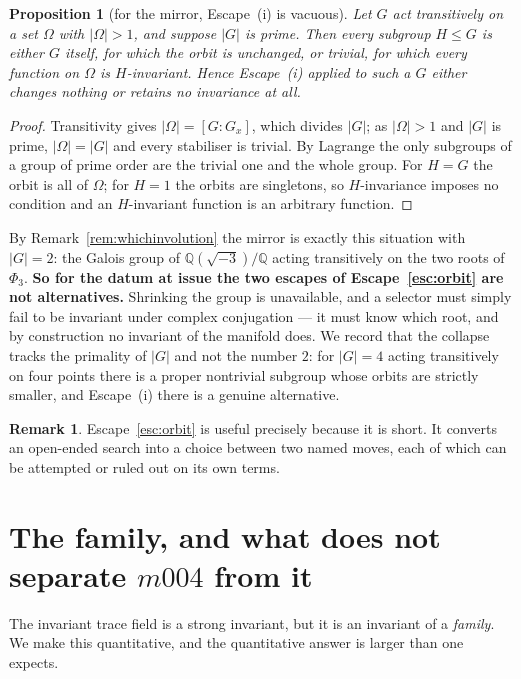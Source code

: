 \documentclass[11pt,a4paper]{article}
\newtheorem{proposition}[theorem]{Proposition}
\theoremstyle{definition}
\newtheorem{remark}[theorem]{Remark}
\theoremstyle{remark}
\newcommand{\Q}{\mathbb{Q}}
\begin{document}
\begin{proposition}[for the mirror, Escape~(i) is vacuous]\label{prop:onlyescape}
Let $G$ act transitively on a set $\Omega$ with $|\Omega|>1$, and suppose $|G|$ is prime. Then
every subgroup $H\le G$ is either $G$ itself, for which the orbit is unchanged, or trivial, for
which \emph{every} function on $\Omega$ is $H$-invariant. Hence Escape~\textup{(i)} applied to such
a $G$ either changes nothing or retains no invariance at all.
\end{proposition}

\begin{proof}
Transitivity gives $|\Omega|=[G:G_x]$, which divides $|G|$; as $|\Omega|>1$ and $|G|$ is prime,
$|\Omega|=|G|$ and every stabiliser is trivial. By Lagrange the only subgroups of a group of prime
order are the trivial one and the whole group. For $H=G$ the orbit is all of $\Omega$; for $H=1$
the orbits are singletons, so $H$-invariance imposes no condition and an $H$-invariant function is
an arbitrary function.
\end{proof}

By Remark~\ref{rem:whichinvolution} the mirror is exactly this situation with $|G|=2$: the Galois
group of $\Q(\sqrt{-3})/\Q$ acting transitively on the two roots of $\Phi_3$. \textbf{So for the
datum at issue the two escapes of Escape~\ref{esc:orbit} are not alternatives.} Shrinking the group
is unavailable, and a selector must simply fail to be invariant under complex conjugation --- it
must know which root, and by construction no invariant of the manifold does. We record that the
collapse tracks the primality of $|G|$ and not the number $2$: for $|G|=4$ acting transitively on
four points there is a proper nontrivial subgroup whose orbits are strictly smaller, and
Escape~\textup{(i)} there is a genuine alternative.

\begin{remark}
Escape~\ref{esc:orbit} is useful precisely because it is short. It converts an open-ended search
into a choice between two named moves, each of which can be attempted or ruled out on its own
terms.
\end{remark}

\section{The family, and what does not separate $m004$ from it}\label{sec:family}

The invariant trace field is a strong invariant, but it is an invariant of a \emph{family}. We
make this quantitative, and the quantitative answer is larger than one expects.
\end{document}
